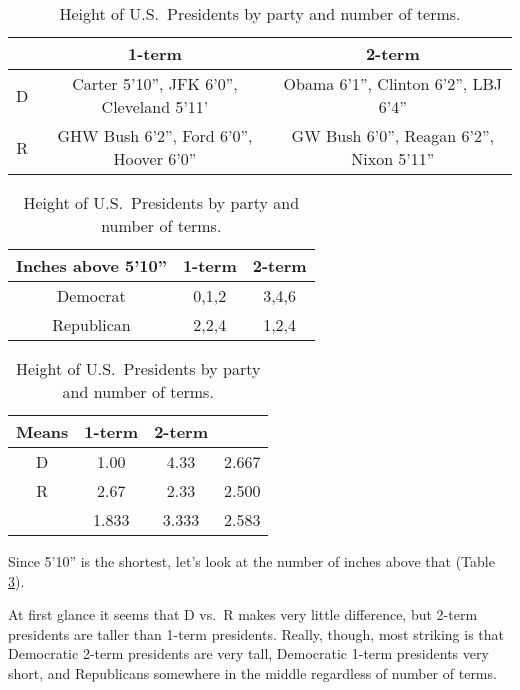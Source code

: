 \begin{table}
	\begin{tabular}{|c|c|c|}
		\hline
		& 1-term & 2-term \\
		\hline
		D & Carter 5'10'', JFK 6'0'', Cleveland 5'11'& Obama 6'1'', Clinton 6'2'', LBJ 6'4'' \\
		R & GHW Bush 6'2'', Ford 6'0'', Hoover 6'0''& GW Bush 6'0'', Reagan 6'2'', Nixon 5'11'' \\
		\hline
	\end{tabular}
\begin{minipage}{0.5\textwidth}
	\begin{tabular}{|c|c|c|}
		\hline
		Inches above 5'10''& 1-term & 2-term \\
		\hline
		Democrat & 0,1,2& 3,4,6 \\
		Republican & 2,2,4& 1,2,4 \\
		\hline
	\end{tabular}
\end{minipage}
\begin{minipage}{0.5\textwidth}
	\begin{tabular}{|c|c|c|c|}
		\hline
		Means& 1-term & 2-term &\\
		\hline
		D & 1.00      & 4.33 & 2.667\\
		R & 2.67   & 2.33 & 2.500\\
		\hline
		 & 1.833   & 3.333  & 2.583\\
		\hline
	\end{tabular}
\end{minipage}
\caption{Height of U.S.~Presidents by party and number of terms.}\label{pres}
\end{table}
Since 5'10'' is the shortest, let's look at the number of inches above that (Table \ref{pres}).


At first glance it seems that D vs.~R makes very little difference, but 2-term presidents are taller than 1-term presidents. 
Really, though, most striking is that Democratic 2-term presidents are very tall, Democratic 1-term presidents very short, and Republicans somewhere in the middle regardless of number of terms.

